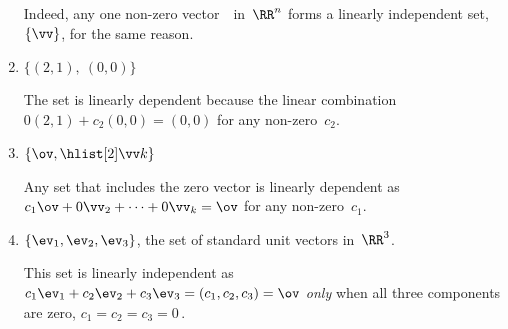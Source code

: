\begin{example}
\begin{enumerate}
\begin{solution}
Indeed, any one non-zero vector~\vv\ in~\(\RR^n\) forms a linearly independent set,~\(\{\vv\}\), for the same reason.
\end{solution}


\item \(\{(2,1),\ (0,0)\}\) 
\begin{solution} 
The set is linearly dependent because the linear combination  \(0(2,1)+c_2(0,0)=(0,0)\) for any non-zero~\(c_2\). 
\end{solution}

\item \(\{\ov,\hlist[2]\vv k\}\)
\begin{solution} 
Any set that includes the zero vector is linearly dependent as
\(c_1\ov+0\vv_2+\cdots+0\vv_k=\ov\) for any non-zero~\(c_1\).
\end{solution}

\item \(\{\ev_1,\ev_2,\ev_3\}\), the set of standard unit vectors in~\(\RR^3\).
\begin{solution} 
This set is linearly independent as
\(c_1\ev_1+c_2\ev_2+c_3\ev_3=(c_1,c_2,c_3)=\ov\)
\emph{only} when all three components are zero, \(c_1=c_2=c_3=0\)\,. 
\end{solution}


\end{enumerate}
\end{example}
